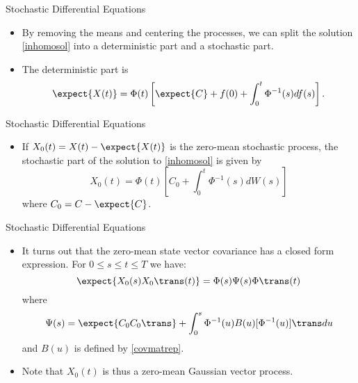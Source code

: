 \begin{frame}
Stochastic Differential Equations
 \begin{itemize}
 \item By removing the means and centering the processes, we can
 split the solution \eqref{inhomosol} into a deterministic part and a
 stochastic part.
 \item The deterministic part is
\begin{equation}\label{detpart}
 \expect{X(t)}=\Phi(t)\left[ \expect{C} + f(0) + \int_0^t\Phi^{-1}(s)df(s)
 \right].
\end{equation}
\end{itemize}
\end{frame}
\begin{frame}
Stochastic Differential Equations
 \begin{itemize}
 \item If $X_0(t)=X(t)-\expect{X(t)}$ is the zero-mean stochastic
 process, the stochastic part of the solution to \eqref{inhomosol}
 is given by
\begin{equation}\label{stochpart}
  X_0(t)=\Phi(t)\left[ C_0 + \int_0^t\Phi^{-1}(s)dW(s)\right]
\end{equation}
where $C_0=C-\expect{C}$.
\end{itemize}
\end{frame}
\begin{frame}
Stochastic Differential Equations
 \begin{itemize}
 \item It turns out that the zero-mean state vector covariance has a closed
 form expression.  For $0\leq s\leq t\leq T$ we have:
\begin{equation}\label{centered_statecov}
 \expect{X_0(s)X_0\trans (t)} = \Phi(s)\Psi(s)\Phi\trans (t)
\end{equation}
where
\[\Psi(s)=  \expect{C_0C_0\trans}
 + \int_0^s\Phi^{-1}(u)B(u)[\Phi^{-1}(u)]\trans du\]
 and $B(u)$ is defined by \eqref{covmatrep}.
 \item Note that $X_0(t)$ is thus a zero-mean Gaussian vector
 process.
\end{itemize}
\end{frame}
